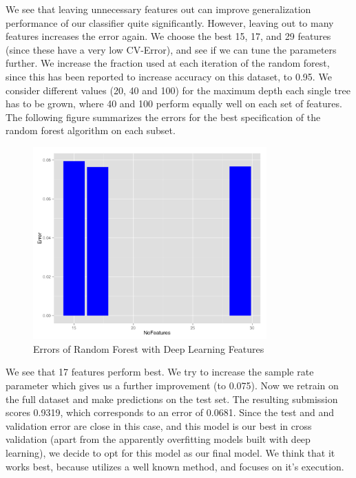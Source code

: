\documentclass[paper=a4, fontsize=11pt]{scrartcl}
\numberwithin{equation}{section}
\numberwithin{figure}{section}
\numberwithin{table}{section}
\begin{document}
We see that leaving unnecessary features out can improve generalization performance of our classifier quite significantly. However, leaving out to many features increases the error again.
We choose the best 15, 17, and 29 features (since these have a very low CV-Error), and see if we can tune the parameters further. We increase the fraction used at each iteration of the random forest, since this has been reported to increase accuracy on this dataset, to 0.95. We consider different values (20, 40 and 100) for the maximum depth each single tree has to be grown, where 40 and 100 perform equally well on each set of features. 
The following figure summarizes the errors for the best specification of the random forest algorithm on each subset. 

\begin{figure}[H]
    \centering
    \includegraphics[width=0.8\textwidth]{barchart_best_features.png}
    \caption{ Errors of Random Forest with Deep Learning Features }
    \label{fig:errors}
\end{figure}


We see that 17 features perform best. We try to increase the sample rate parameter which gives us a further improvement (to 0.075). Now we retrain on the full dataset and make predictions on the test set. The resulting submission scores 0.9319, which corresponds to an error of 0.0681. Since the test and and validation error are close in this case, and this model is our best in cross validation (apart from the apparently overfitting models built with deep learning), we decide to opt for this model as our final model. We think that it works best, because utilizes a well known method, and focuses on it's execution. 
\end{document}
